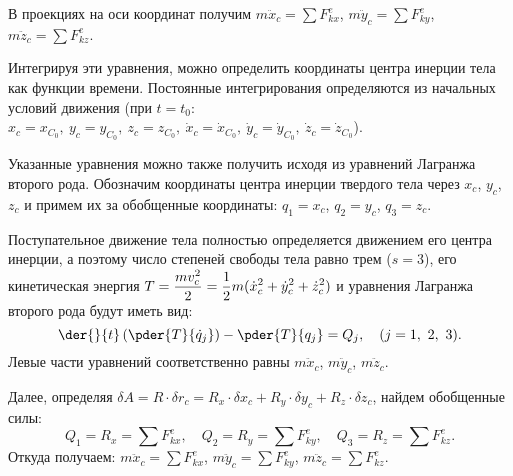 В проекциях на оси координат получим \( m\ddot{x}_c = \sum F^e_{kx} \),
\( m\ddot{y}_c = \sum F^e_{ky} \), \( m\ddot{z}_c = \sum F^e_{kz} \).

Интегрируя эти уравнения, можно определить координаты центра инерции тела как
функции времени. Постоянные интегрирования определяются из начальных условий
движения (при \( t = t_0 \): \( x_c = x_{C_0},\ y_c = y_{C_0},\ z_c = z_{C_0},\ 
\dot{x}_c = \dot{x}_{C_0},\ \dot{y}_c = \dot{y}_{C_0},\ 
\dot{z}_c = \dot{z}_{C_0} \)).

Указанные уравнения можно также получить исходя из уравнений Лагранжа второго рода.
Обозначим координаты центра инерции твердого тела через \( x_c \), \( y_c \),
\( z_c \) и примем их за обобщенные координаты: \( q_1 = x_c \),
\( q_2 = y_c \), \( q_3 = z_c \).

Поступательное движение тела полностью определяется движением его центра
инерции, а поэтому число степеней свободы тела равно трем (\( s = 3 \)), его
кинетическая энергия \( \displaystyle T = \frac{mv_c^2}{2} = \frac{1}{2}m(\dot{x}_c^2 +
\dot{y}_c^2 + \dot{z}_c^2) \) и уравнения Лагранжа второго рода будут иметь вид:
\[
    \der{}{t}\left( \pder{T}{\dot{q}_j} \right) - \pder{T}{q_j} = Q_j, \quad
    (j = 1,\ 2,\ 3).
\]
Левые части уравнений соответственно равны \( m\ddot{x}_c \), \( m\ddot{y}_c \),
\( m\ddot{z}_c \).

Далее, определяя \( \delta A = R\cdot\delta r_c = R_x\cdot\delta x_c +
R_y\cdot\delta y_c + R_z\cdot\delta z_c \), найдем обобщенные силы:
\[
    Q_1 = R_x = \sum F^e_{kx}, \quad Q_2 = R_y = \sum F^e_{ky}, \quad
    Q_3 = R_z = \sum F^e_{kz}.
\]
Откуда получаем: \( m\ddot{x}_c = \sum F^e_{kx} \),
\( m\ddot{y}_c = \sum F^e_{ky} \), \( m\ddot{z}_c = \sum F^e_{kz} \).
\newpage

